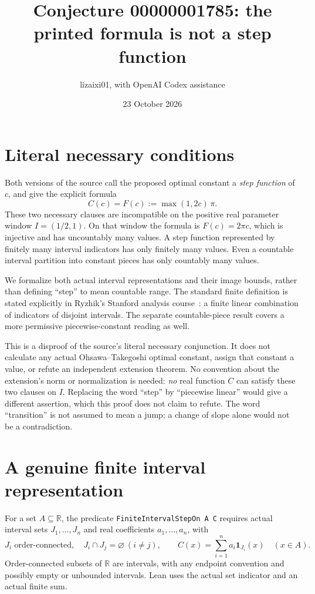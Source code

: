 \documentclass[11pt]{article}
\title{Conjecture 00000001785: the printed formula is not a step function}
\author{lizaixi01, with OpenAI Codex assistance}
\date{23 October 2026}
\begin{document}
\maketitle
\section{Literal necessary conditions}
Both versions of the source call the proposed optimal constant a
\emph{step function} of $c$, and give the explicit formula
\[
 C(c)=F(c):=\max(1,2c)\,\pi.
\]
These two necessary clauses are incompatible on the positive real
parameter window $I=(1/2,1)$. On that window the formula is
$F(c)=2\pi c$, which is injective and has uncountably many values.
A step function represented by finitely many interval indicators has
only finitely many values. Even a countable interval partition into
constant pieces has only countably many values.

We formalize both actual interval representations and their image
bounds, rather than defining ``step'' to mean countable range.
The standard finite definition is stated explicitly in Ryzhik's
Stanford analysis course~\cite[Problem 1(i), p.~1]{Ryzhik}: a finite
linear combination of indicators of disjoint intervals.
The separate countable-piece result covers a more permissive
piecewise-constant reading as well.

This is a disproof of the source's literal necessary conjunction.
It does not calculate any actual Ohsawa--Takegoshi optimal constant,
assign that constant a value, or refute an independent extension
theorem. No convention about the extension's norm or normalization
is needed: \emph{no} real function $C$ can satisfy these two clauses
on $I$. Replacing the word ``step'' by ``piecewise linear'' would
give a different assertion, which this proof does not claim to
refute. The word ``transition'' is not assumed to mean a jump; a
change of slope alone would not be a contradiction.

\section{A genuine finite interval representation}
For a set $A\subseteq\mathbb R$, the predicate
\texttt{FiniteIntervalStepOn A C} requires actual interval sets
$J_1,\ldots,J_n$ and real coefficients $a_1,\ldots,a_n$, with
\[
 J_i\text{ order-connected},\quad J_i\cap J_j=\varnothing\ (i\ne j),
 \qquad C(x)=\sum_{i=1}^n a_i\mathbf 1_{J_i}(x)\quad(x\in A).
\]
Order-connected subsets of $\mathbb R$ are intervals, with any
endpoint convention and possibly empty or unbounded intervals.
Lean uses the actual set indicator and an actual finite sum.
\end{document}
